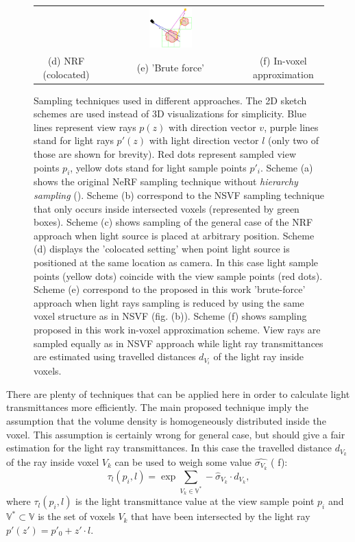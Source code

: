 \begin{figure}[!htbp]
\begin{tabular}{ccc}
          & \includegraphics[width=0.32\textwidth]{figures/sampling_iva.png}
          \\(d) NRF (colocated) & (e) 'Brute force'& (f) In-voxel approximation
    \end{tabular}
    \caption{
Sampling techniques used in different approaches.
The 2D sketch schemes are used instead of 3D visualizations for simplicity.
Blue lines represent view rays $p(z)$ with direction vector $v$,
purple lines stand for light rays $p'(z)$ with light direction vector $l$
(only two of those are shown for brevity).
Red dots represent sampled view points $p_i$, yellow dots stand for light sample points $p'_i$.
Scheme (a) shows the original NeRF sampling technique without \textit{hierarchy sampling} ().
Scheme (b) correspond to the NSVF sampling technique
that only occurs inside intersected voxels (represented by green boxes).
Scheme (c) shows sampling of the general case of the NRF approach
when light source is placed at arbitrary position.
Scheme (d) displays the 'colocated setting'
when point light source is positioned at the same location as camera.
In this case light sample points (yellow dots) coincide with the view sample points (red dots).
Scheme (e) correspond to the proposed in this work 'brute-force' approach
when light rays sampling is reduced by using the same voxel structure as in NSVF (fig. (b)).
Scheme (f) shows sampling proposed in this work in-voxel approximation scheme.
View rays are sampled equally as in NSVF approach
while light ray transmittances are estimated using travelled distances $d_{V_i}$
of the light ray inside voxels.
}
\label{fig:samplings}
\end{figure}

There are plenty of techniques that can be applied here in order to calculate light transmittances more efficiently.
The main proposed technique imply the assumption
that the volume density is homogeneously distributed inside the voxel.
This assumption is certainly wrong for general case,
but should give a fair estimation for the light ray transmittances.
In this case the travelled distance $d_{V_k}$ of the ray inside voxel $V_k$
can be used to weigh some value $\hat{\sigma_{V_k}}$ ( f):
\begin{equation}
    \label{eq:light_ray_transmittance}
    \tau_l(p_i, l) = \exp \sum_{V_k \in \mathbb{V}^*} -\hat{\sigma}_{V_k} \cdot d_{V_k},
\end{equation}
where $\tau_l(p_i, l)$ is the light transmittance value at the view sample point $p_i$
and $\mathbb{V}^* \subset \mathbb{V}$ is the set of voxels $V_k$
that have been intersected by the light ray $p'(z') = p'_0 + z' \cdot l$.

